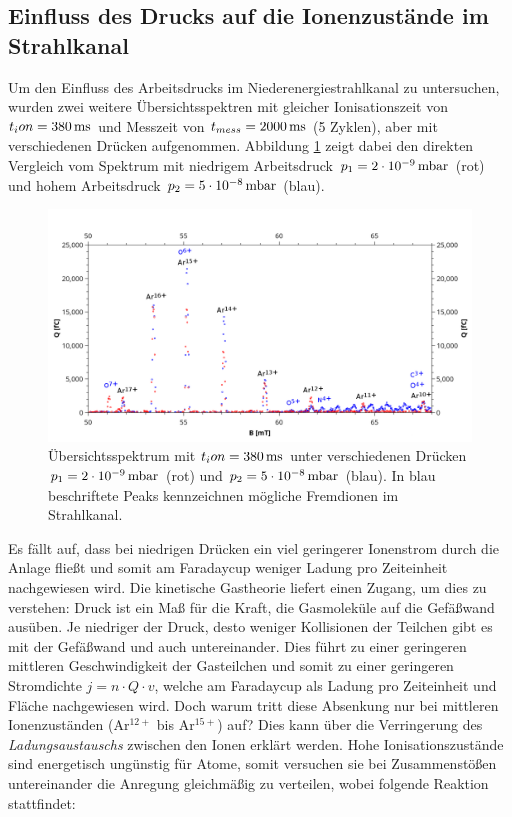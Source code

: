 	\subsection{Einfluss des Drucks auf die Ionenzustände im Strahlkanal}
		Um den Einfluss des Arbeitsdrucks im Niederenergiestrahlkanal zu untersuchen, wurden zwei weitere Übersichtsspektren mit gleicher Ionisationszeit von $t_ion = \unit[380]{ms}$ und Messzeit von $t_{mess} = \unit[2000]{ms}$ (5 Zyklen), aber mit verschiedenen Drücken aufgenommen. Abbildung \ref{fig:all} zeigt dabei den direkten Vergleich vom Spektrum mit niedrigem Arbeitsdruck $p_1 = \unit[2\cdot 10^{-9}]{mbar}$ (rot) und hohem Arbeitsdruck $p_2 = \unit[5\cdot 10^{-8}]{mbar}$ (blau).
		\begin{figure}[htb]
			\centering
			\includegraphics[width=\linewidth]{pic/all_beschriftet.png}
			\caption{Übersichtsspektrum mit $t_ion = \unit[380]{ms}$ unter verschiedenen Drücken $p_1 = \unit[2\cdot 10^{-9}]{mbar}$ (rot) und $p_2 = \unit[5\cdot 10^{-8}]{mbar}$ (blau). In blau beschriftete Peaks kennzeichnen mögliche Fremdionen im Strahlkanal.}
			\label{fig:all}	
		\end{figure}
		Es fällt auf, dass bei niedrigen Drücken ein viel geringerer Ionenstrom durch die Anlage fließt und somit am Faradaycup weniger Ladung pro Zeiteinheit nachgewiesen wird. Die kinetische Gastheorie liefert einen Zugang, um dies zu verstehen: Druck ist ein Maß für die Kraft, die Gasmoleküle auf die Gefäßwand ausüben. Je niedriger der Druck, desto weniger Kollisionen der Teilchen gibt es mit der Gefäßwand und auch untereinander. Dies führt zu einer geringeren mittleren Geschwindigkeit der Gasteilchen und somit zu einer geringeren Stromdichte $j = n\cdot Q \cdot v$, welche am Faradaycup als Ladung pro Zeiteinheit und Fläche nachgewiesen wird. Doch warum tritt diese Absenkung nur bei mittleren Ionenzuständen (Ar$^{12+}$ bis Ar$^{15+}$) auf? Dies kann über die Verringerung des \textit{Ladungsaustauschs} zwischen den Ionen erklärt werden. Hohe Ionisationszustände sind energetisch ungünstig für Atome, somit versuchen sie bei Zusammenstößen untereinander die Anregung gleichmäßig zu verteilen, wobei folgende Reaktion stattfindet:

